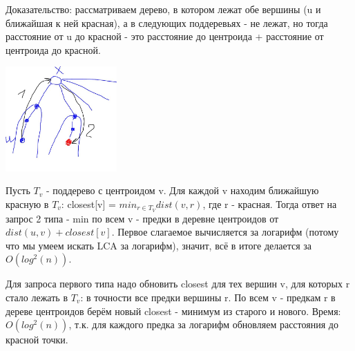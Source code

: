 Доказательство: рассматриваем дерево, в котором лежат обе вершины (u и ближайшая к ней красная), а в следующих поддеревьях - не лежат, но тогда расстояние от u до красной - это расстояние до центроида + расстояние от центроида до красной.

\includegraphics[height=4cm]{images/100-102_dist_red2}

Пусть $T_v$ - поддерево с центроидом v. Для каждой v находим ближайшую красную в $T_v$: closest[v] = $min_{r \in T_V} dist(v, r)$, где r - красная. Тогда ответ на запрос 2 типа - min по всем v - предки в деревне центроидов от $dist(u, v) + closest[v]$. Первое слагаемое вычисляется за логарифм (потому что мы умеем искать LCA за логарифм), значит, всё в итоге делается за $O(log^2(n))$.

Для запроса первого типа надо обновить closest для тех вершин v, для которых r стало лежать в $T_v$: в точности все предки вершины r. По всем v - предкам r в дереве центроидов берём новый closest - минимум из старого и нового. Время: $O(log^2(n))$, т.к. для каждого предка за логарифм обновляем расстояния до красной точки.